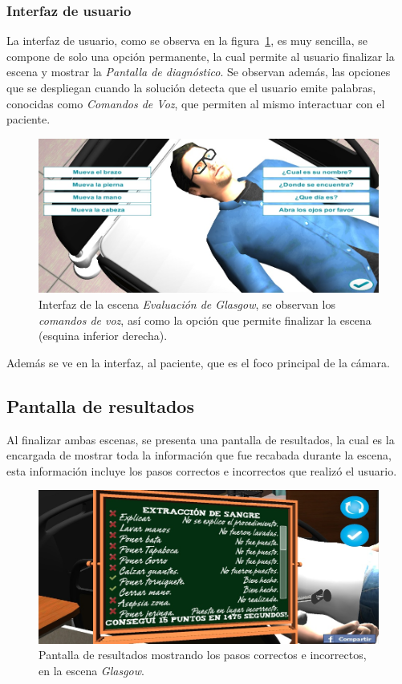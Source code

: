 \subsubsection{Interfaz de usuario}

La interfaz de usuario, como se observa en la figura~\ref{fig:glasgow_gui}, es
muy sencilla, se compone de solo una opción permanente, la cual permite al
usuario finalizar la escena y mostrar la \emph{Pantalla de diagnóstico}. Se
observan además, las opciones que se despliegan cuando la solución detecta que el
usuario emite palabras, conocidas como \emph{Comandos de Voz}, que permiten al
mismo interactuar con el paciente.

\begin{figure}[H]
\centering
\includegraphics[scale=0.5]{solucion/images/glasgow_comandos_voz.jpg}
\caption{Interfaz de la escena \emph{Evaluación de Glasgow}, se observan los
    \emph{comandos de voz}, así como la opción que permite finalizar la escena
    (esquina inferior derecha).}
\label{fig:glasgow_gui}
\end{figure}

Además se ve en la interfaz, al paciente, que es el foco principal de la cámara.

\subsection{Pantalla de resultados}

Al finalizar ambas escenas, se presenta una pantalla de resultados, la cual es
la encargada de mostrar toda la información que fue recabada durante la escena,
esta información incluye los pasos correctos e incorrectos que realizó el
usuario.

\begin{figure}[H]
\centering
\includegraphics[scale=0.5]{solucion/images/resultado_hemocultivo.jpg}
\caption{Pantalla de resultados mostrando los pasos correctos e incorrectos, en
    la escena \emph{Glasgow}.}
\label{fig:resultados_glasgow}
\end{figure}


